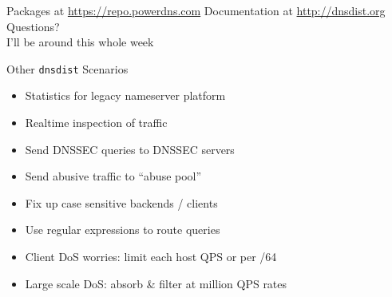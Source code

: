 \documentclass{beamer}
\begin{document}
\begin{frame}[standout]
  Packages at \url{https://repo.powerdns.com}
  \vfill
  Documentation at \url{http://dnsdist.org}
  \vfill
  {\huge Questions?\\I'll be around this whole week}
\end{frame}

\begin{frame}{Other \texttt{dnsdist} Scenarios}
  \begin{itemize}
    \item Statistics for legacy nameserver platform
    \item Realtime inspection of traffic
    \item Send DNSSEC queries to DNSSEC servers
    \item Send abusive traffic to ``abuse pool''
    \item Fix up case sensitive backends / clients
    \item Use regular expressions to route queries
    \item Client DoS worries: limit each host QPS or per /64
    \item Large scale DoS: absorb \& filter at million QPS rates
  \end{itemize}
\end{frame}
\end{document}
